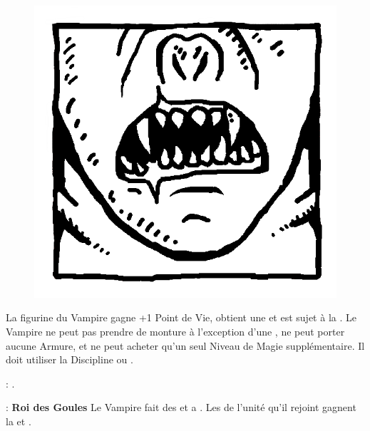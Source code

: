 
\begin{figure}
\centering
\includegraphics[width=\logosize]{logos/logo_strigoi.png}
\end{figure}
La figurine du Vampire gagne +1 Point de Vie, obtient une  et est sujet à la \hatred{}. Le Vampire ne peut pas prendre de monture à l'exception d'une \shriekinghorror{}, ne peut porter aucune Armure, et ne peut acheter qu'un seul Niveau de Magie supplémentaire. Il doit utiliser la Discipline \wilderness{} ou \necromancy{}.

\vspace{0.5cm}
\bloodties{} : \textbf{\ghouls{}}.

\vspace{0.5cm}
\ancientbloodpower{} : \textbf{Roi des Goules}\dotfill{}\newline%
Le Vampire fait des \poisonedattacks{} et a . Les \ghouls{} de l'unité qu'il rejoint gagnent la \hatred{} et .


